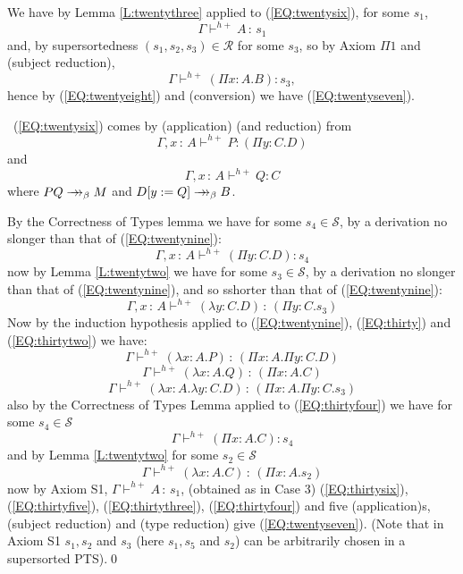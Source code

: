 \documentclass{LMCS}
\def\:{\mathbin{\,:\,}}
\begin{document}
  We have by Lemma \ref{L:twentythree} applied to (\ref{EQ:twentysix}), for some $s_1$,
\[\Gamma\vdash^{h+} A\:s_1\]
  and, by supersortedness $(s_1,s_2,s_3)\in {\mathcal R}$ for some
  $s_3$, so by Axiom $\Pi 1$ and (subject reduction),
\[\Gamma\vdash^{h +}(\Pi x{:}A.B):s_3,\]
  hence by (\ref{EQ:twentyeight}) and (conversion) we have
  (\ref{EQ:twentyseven}).

\ (\ref{EQ:twentysix}) comes by (application) (and reduction) from
\begin{equation}\label{EQ:twentynine}
 \Gamma, x\:A\vdash^{h +} P:(\Pi y{:}C.D)
\end{equation}
  and
\begin{equation}\label{EQ:thirty}
 \Gamma, x\:A\vdash^{h +}Q:C
\end{equation}
  where $ PQ\to\hskip -7pt\to_{\beta}M$ and $D[y:=Q]\to\hskip -7pt
 \to_{\beta}B$.

  By the Correctness of Types lemma we have for some $s_4\in{\mathcal
  S}$, by a derivation no slonger than that of (\ref{EQ:twentynine}):
\begin{equation}\label{EQ:thiryone}
 \Gamma, x\:A\vdash^{h+}(\Pi y{:}C.D):s_4
\end{equation}
  now by Lemma \ref{L:twentytwo} we have for some $s_3\in{\mathcal S}$, by a
  derivation no slonger than that of (\ref{EQ:twentynine}), and so sshorter than that
  of (\ref{EQ:twentynine}):
\begin{equation}\label{EQ:thirtytwo}
 \Gamma, x\:A\vdash^{h+}(\lambda y{:}C.D)\:(\Pi y{:}C.s_3)
\end{equation}
  Now by the induction hypothesis applied to (\ref{EQ:twentynine}),
  (\ref{EQ:thirty}) and (\ref{EQ:thirtytwo}) we have:
\begin{equation}\label{EQ:thirtythree}
 \Gamma\vdash^{h+}(\lambda x{:}A.P)\:(\Pi x{:}A.\Pi y{:}C.D)
\end{equation}
\begin{equation}\label{EQ:thirtyfour}
 \Gamma\vdash^{h+}(\lambda x{:}A.Q)\:(\Pi x{:}A.C)
\end{equation}
\begin{equation}\label{EQ:thirtyfive}
 \Gamma\vdash^{h+}(\lambda x{:}A.\lambda y{:}C.D)\:(\Pi x{:}A.\Pi y{:}C.s_3)
\end{equation}
  also by the Correctness of Types Lemma applied to
  (\ref{EQ:thirtyfour}) we have for some $s_4\in{\mathcal S}$
\[\Gamma\vdash^{h+}(\Pi x{:}A.C):s_4\]
  and by Lemma \ref{L:twentytwo} for some $s_2\in {\mathcal S}$
\begin{equation}\label{EQ:thirtysix}
 \Gamma\vdash^{h+}(\lambda x{:}A.C)\:(\Pi x{:}A.s_2)
\end{equation}
  now by Axiom S1, $\Gamma\vdash^{h+}A\:s_1$, (obtained as in Case 3)
  (\ref{EQ:thirtysix}), (\ref{EQ:thirtyfive}), (\ref{EQ:thirtythree}),
  (\ref{EQ:thirtyfour}) and five (application)s, (subject reduction)
  and (type reduction) give (\ref{EQ:twentyseven}). (Note that in
  Axiom S1 $s_1, s_2$ and $s_3$ (here $s_1, s_5$ and $s_2$) can be
  arbitrarily chosen in a supersorted PTS).\qed
\end{document}

